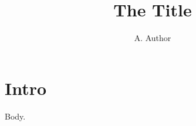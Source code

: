 \documentclass{article}
\title{The Title}
\author{A. Author}
\begin{document}
  

\vspace*{1cm}
\maketitle
\section{Intro}
Body.
\end{document}
